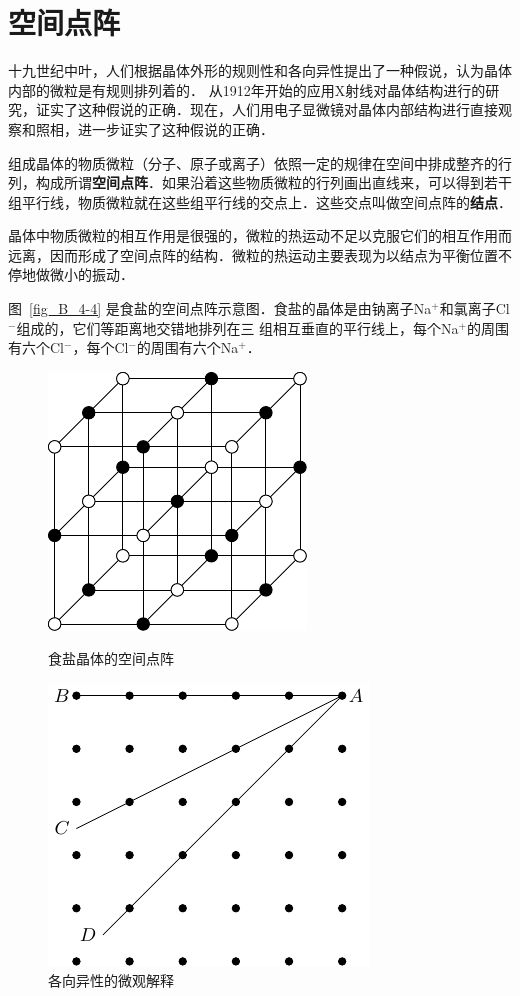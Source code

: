 \section{空间点阵}
十九世纪中叶，人们根据晶体外形的规则性和各向异性提出了一种假说，认为晶体内部的微粒是有规则排列着的．
从1912年开始的应用X射线对晶体结构进行的研究，证实了这种假说的正确．现在，人们用电子显微镜对晶体内部结构进行直接观察和照相，进一步证实了这种假说的正确．

组成晶体的物质微粒（分子、原子或离子）依照一定的规律在空间中排成整齐的行列，构成所谓\textbf{空间点阵}．如果沿着这些物质微粒的行列画出直线来，可以得到若干组平行线，物质微粒就在这些组平行线的交点上．这些交点叫做空间点阵的\textbf{结点}．

晶体中物质微粒的相互作用是很强的，微粒的热运动不足以克服它们的相互作用而远离，因而形成了空间点阵的结构．微粒的热运动主要表现为以结点为平衡位置不停地做微小的振动．


图~\ref{fig_B_4-4} 是食盐的空间点阵示意图．食盐的晶体是由钠离子Na$^+$和氯离子Cl$^-$组成的，它们等距离地交错地排列在三
组相互垂直的平行线上，每个Na$^+$的周围有六个Cl$^-$，每个Cl$^-$的周围有六个Na$^+$．

\begin{figure}[htbp]
	\centering
	\begin{minipage}[t]{0.48\linewidth}
		\centering
		\includegraphics{fig/B/4-4.pdf}
		\caption{食盐晶体的空间点阵}\label{fig_B_4-4}
	\end{minipage}
	\begin{minipage}[t]{0.48\linewidth}
		\centering
		\includegraphics{fig/B/4-5.pdf}
		\caption{各向异性的微观解释}\label{fig_B_4-5}
	\end{minipage}
\end{figure}


